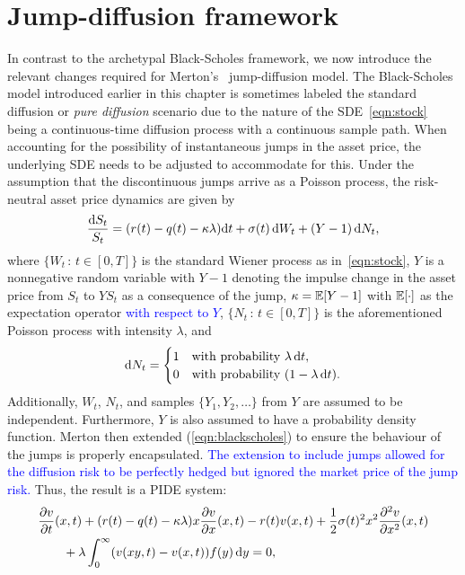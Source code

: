 \section{Jump-diffusion framework}
In contrast to the archetypal Black-Scholes framework, we now introduce the relevant changes required for Merton's~\cite{Merton1976} jump-diffusion model. The Black-Scholes model introduced earlier in this chapter is sometimes labeled the standard diffusion or \emph{pure diffusion} scenario due to the nature of the SDE~\eqref{eqn:stock} being a continuous-time diffusion process with a continuous sample path. When accounting for the possibility of instantaneous jumps in the asset price, the underlying SDE needs to be adjusted to accommodate for this. Under the assumption that the discontinuous jumps arrive as a Poisson process, the risk-neutral asset price dynamics are given by
	\begin{equation}
		\label{eqn:assetPriceDynamics}
		\frac{\mathrm d S_t}{S_t} = (r(t) - q(t) - \kappa\lambda)\mathrm d t + \sigma(t) \, \mathrm d W_t + (Y - 1) \, \mathrm d N_t,
	\end{equation}
where $\{W_t \, : \, t \in [0,T]\}$ is the standard Wiener process as in~\eqref{eqn:stock}, $Y$ is a nonnegative random variable with $Y-1$ denoting the impulse change in the asset price from $S_t$ to $YS_t$ as a consequence of the jump, $\kappa = \mathbb E[Y-1]$ with $\mathbb E[\cdot]$ as the expectation operator \textcolor{blue}{with respect to $Y$}, $\{N_t \, : \, t \in [0,T]\}$ is the aforementioned Poisson process with intensity $\lambda$, and
	\begin{equation}
		\label{eqn:dNProb}
		\mathrm d N_t = \begin{cases}
			1 &\mbox{with probability } \lambda \, \mathrm d t, \\
			0 &\mbox{with probability } (1 - \lambda \, \mathrm d t).
		\end{cases}
	\end{equation}
Additionally, $W_t$, $N_t$, and samples $\{Y_1,Y_2,\hdots\}$ from $Y$ are assumed to be independent. Furthermore, $Y$ is also assumed to have a probability density function. Merton then extended (\ref{eqn:blackscholes}) to ensure the behaviour of the jumps is properly encapsulated. \textcolor{blue}{The extension to include jumps allowed for the diffusion risk to be perfectly hedged but ignored the market price of the jump risk.} Thus, the result is a PIDE system:
	\begin{align}
		\label{eqn:PIDE}
		\begin{split}
			&\frac{\partial v}{\partial t}(x,t) + (r(t) - q(t) - \kappa\lambda)x\frac{\partial v}{\partial x}(x,t) - r(t)v(x,t) + \frac{1}{2}\sigma(t)^2x^2\frac{\partial^2 v}{\partial x^2}(x,t) \\
			& \qquad + \lambda \int_0^\infty (v(xy,t) - v(x,t))f(y) \, \mathrm d y = 0,
		\end{split}
	\end{align}
